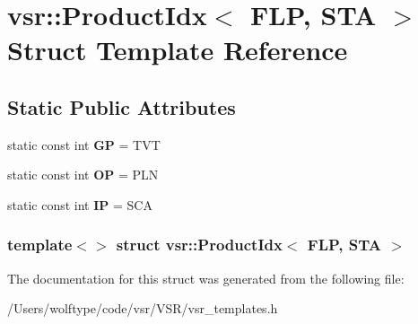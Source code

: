 \hypertarget{structvsr_1_1_product_idx_3_01_f_l_p_00_01_s_t_a_01_4}{\section{vsr\-:\-:Product\-Idx$<$ F\-L\-P, S\-T\-A $>$ Struct Template Reference}
\label{structvsr_1_1_product_idx_3_01_f_l_p_00_01_s_t_a_01_4}
}
\subsection*{Static Public Attributes}
\begin{DoxyCompactItemize}
\item 
\hypertarget{structvsr_1_1_product_idx_3_01_f_l_p_00_01_s_t_a_01_4_a1920572af3c7c5730183b394fdf4c3f7}{static const int {\bfseries G\-P} = T\-V\-T}\label{structvsr_1_1_product_idx_3_01_f_l_p_00_01_s_t_a_01_4_a1920572af3c7c5730183b394fdf4c3f7}

\item 
\hypertarget{structvsr_1_1_product_idx_3_01_f_l_p_00_01_s_t_a_01_4_a394f73a2d10e6b6ad683bc1ef68c1450}{static const int {\bfseries O\-P} = P\-L\-N}\label{structvsr_1_1_product_idx_3_01_f_l_p_00_01_s_t_a_01_4_a394f73a2d10e6b6ad683bc1ef68c1450}

\item 
\hypertarget{structvsr_1_1_product_idx_3_01_f_l_p_00_01_s_t_a_01_4_a4e7e6ef1cff6a40f1b7b570216892298}{static const int {\bfseries I\-P} = S\-C\-A}\label{structvsr_1_1_product_idx_3_01_f_l_p_00_01_s_t_a_01_4_a4e7e6ef1cff6a40f1b7b570216892298}

\end{DoxyCompactItemize}
\subsubsection*{template$<$$>$ struct vsr\-::\-Product\-Idx$<$ F\-L\-P, S\-T\-A $>$}



The documentation for this struct was generated from the following file\-:\begin{DoxyCompactItemize}
\item 
/\-Users/wolftype/code/vsr/\-V\-S\-R/vsr\-\_\-templates.\-h\end{DoxyCompactItemize}

